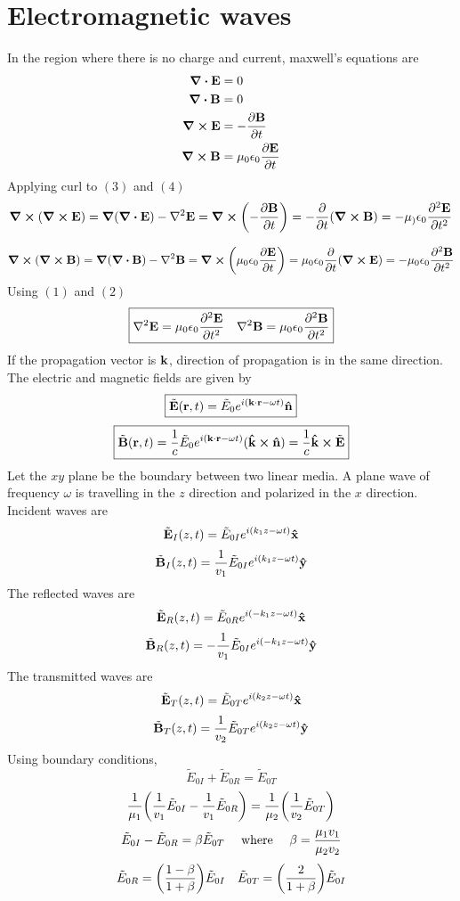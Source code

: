 \documentclass[12pt]{article}
\begin{document}
\section{Electromagnetic waves}
In  the region where there is no charge and current, maxwell's equations are 
\begin{align}
\div{\vb{E}}&=0\\
\div{\vb{B}}&=0\\
\curl{\vb{E}}&=-\pdv{\vb{B}}{t}\\
\curl{\vb{B}}&=\mu_0\epsilon_0\pdv{\vb{E}}{t}
\end{align}
Applying curl to $(3)$ and $(4)$ 
\[\curl{\qty(\curl{\vb{E}})}=\grad{\qty(\div{\vb{E}})}-\laplacian{\vb{E}}=\curl{\qty(-\pdv{\vb{B}}{t})}=-\pdv{t}\qty(\curl{\vb{B}})=-\mu_)\epsilon_0\pdv[2]{\vb{E}}{t}\]

\[\curl{\qty(\curl{\vb{B}})}=\grad{\qty(\div{\vb{B}})}-\laplacian{\vb{B}}=\curl{\qty(\mu_0\epsilon_0\pdv{\vb{E}}{t})}=\mu_0\epsilon_0\pdv{t}\qty(\curl{\vb{E}})=-\mu_0\epsilon_0\pdv[2]{\vb{B}}{t}\]
Using $(1)$ and $(2)$ \\
\[\boxed{\laplacian{\vb{E}}=\mu_0\epsilon_0\pdv[2]{\vb{E}}{t}\quad\laplacian{\vb{B}}=\mu_0\epsilon_0\pdv[2]{\vb{B}}{t}}\]
If the propagation vector is $\vb{k}$, direction of propagation is in the same direction.
The electric and magnetic fields are given by
\[\boxed{\tilde{\vb{E}}(\vb{r},t)=\tilde{E}_0e^{i(\vb{k}\cdot\vb{r}-\omega t)}\vu{n}}\]
\[\boxed{\tilde{\vb{B}}(\vb{r},t)=\frac{1}{c}\tilde{E}_0e^{i(\vb{k}\cdot\vb{r}-\omega t)}(\vu{k}\cp\vu{n})=\frac{1}{c}\vu{k}\cp\tilde{\vb{E}}}\]
Let the $xy$ plane be the boundary between two linear media. A plane wave of frequency $\omega$ is travelling in the $z$ direction and polarized in the $x$ direction.\\
Incident waves are \[\tilde{\vb{E}}_I(z,t)=\tilde{E}_{0I}e^{i(k_1z-\omega t)}\vu{x}\]
\[\tilde{\vb{B}}_I(z,t)=\frac{1}{v_1}\tilde{E}_{0I}e^{i(k_1z-\omega t)}\vu{y}\]
The reflected waves are  \[\tilde{\vb{E}}_R(z,t)=\tilde{E}_{0R}e^{i(-k_1z-\omega t)}\vu{x}\]
\[\tilde{\vb{B}}_R(z,t)=-\frac{1}{v_1}\tilde{E}_{0I}e^{i(-k_1z-\omega t)}\vu{y}\]
The transmitted waves are  \[\tilde{\vb{E}}_T(z,t)=\tilde{E}_{0T}e^{i(k_2z-\omega t)}\vu{x}\]
\[\tilde{\vb{B}}_T(z,t)=\frac{1}{v_2}\tilde{E}_{0T}e^{i(k_2z-\omega t)}\vu{y}\]
Using boundary conditions,\\
\[\tilde{E}_{0I}+\tilde{E}_{0R}=\tilde{E}_{0T}\]
\[\frac{1}{\mu_1}\qty(\frac{1}{v_1}\tilde{E}_{0I}-\frac{1}{v_1}\tilde{E}_{0R})=\frac{1}{\mu_2}\qty(\frac{1}{v_2}\tilde{E}_{0T})\]
\[\tilde{E}_{0I}-\tilde{E}_{0R}=\beta\tilde{E}_{0T}\qq{ where }\beta=\frac{\mu_1v_1}{\mu_2v_2}\]
\[\tilde{E}_{0R}=\qty(\frac{1-\beta}{1+\beta})\tilde{E}_{0I}\quad\tilde{E}_{0T}=\qty(\frac{2}{1+\beta})\tilde{E}_{0I}\]
\end{document}
